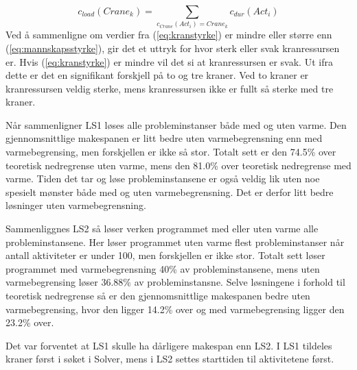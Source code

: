 \begin{equation}
c_{load}(Crane_{k}) = \sum_{c_{Crane}(Act_{i})=Crane_{k}} c_{dur}(Act_{i})
\label{eq:kranstyrke}
\end{equation}
Ved å sammenligne om verdier fra (\ref{eq:kranstyrke}) er mindre eller større enn (\ref{eq:mannskapsstyrke}), gir det et uttryk for hvor sterk eller svak kranressursen er. Hvis (\ref{eq:kranstyrke}) er mindre vil det si at kranressursen er svak. Ut ifra dette er det en signifikant forskjell på to og tre kraner. Ved to kraner er kranressursen veldig sterke, mens kranressursen ikke er fullt så sterke med tre kraner.

Når sammenligner LS1 løses alle probleminstanser både med og uten varme. Den gjennomsnittlige makespanen er litt bedre uten varmebegrensning enn med varmebegrensing, men forskjellen er ikke så stor. Totalt sett er den 74.5\% over teoretisk nedregrense uten varme, mens den 81.0\% over teoretisk nedregrense med varme. Tiden det tar og løse probleminstansene er også veldig lik uten noe spesielt mønster både med og uten varmebegrensning. Det er derfor litt bedre løsninger uten varmebegrensning.

Sammenliggnes LS2 så løser verken programmet med eller uten varme alle probleminstansene. Her løser programmet uten varme flest probleminstanser når antall aktiviteter er under 100, men forskjellen er ikke stor. Totalt sett løser programmet med varmebegrensning 40\% av probleminstansene, mens uten varmebegrensing løser 36.88\% av probleminstansne. Selve løsningene i forhold til teoretisk nedregrense så er den gjennomsnittlige makespanen bedre uten varmebegrensing, hvor den ligger 14.2\% over og med varmebegrensing ligger den 23.2\% over.

Det var forventet at LS1 skulle ha dårligere makespan enn LS2. I LS1 tildeles kraner først i søket i Solver, mens i LS2 settes starttiden til aktivitetene først.

